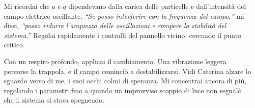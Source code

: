Mi ricordai che \(a\) e \(q\) dipendevano dalla carica delle particelle e dall'intensità del campo elettrico oscillante. \textit{“Se posso interferire con la frequenza del campo,”} mi dissi, \textit{“posso ridurre l’ampiezza delle oscillazioni e rompere la stabilità del sistema.”} Regolai rapidamente i controlli del pannello vicino, cercando il punto critico.

\begin{center}
\begin{minipage}{0.7\textwidth}
    \centering
\end{minipage}
\end{center}

Con un respiro profondo, applicai il cambiamento. Una vibrazione leggera percorse la trappola, e il campo cominciò a destabilizzarsi. Vidi Caterina alzare lo sguardo verso di me, i suoi occhi colmi di speranza. Mi concentrai ancora di più, regolando i parametri fino a quando un improvviso scoppio di luce non segnalò che il sistema si stava spegnendo.

